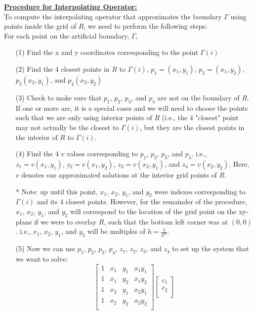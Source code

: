 \documentclass[12pt]{article}
\begin{document}
\noindent
\underline{\textbf{Procedure for Interpolating Operator:}} \text{ }\\
To compute the interpolating operator that approximates the boundary $\Gamma$ using points inside the grid of $R$, we need to perform the following steps:\\

\noindent
For each point on the artificial boundary, $\Gamma$,
\begin{itemize}
\item[(1)] Find the x and y coordinates corresponding to the point $\Gamma(i)$
\item[(2)] Find the 4 closest points in $R$ to $\Gamma(i)$, $p_1=(x_1,y_1)$, $p_2=(x_1,y_2)$, $p_3(x_2,y_1)$, and $p_4(x_2,y_2)$
\item[(3)] Check to make sure that $p_1$, $p_2$, $p_3$, and $p_4$ are not on the boundary of $R$.  If one or more are, it is a special cases and we will need to choose the points such that we are only using interior points of $R$ (i.e., the 4 "closest" point may not actually be the closest to $\Gamma(i)$, but they are the closest points in the interior of $R$ to $\Gamma(i)$.
\item[(4)] Find the 4 $v$ values corresponding to $p_1$, $p_2$, $p_3$, and $p_4$. i.e., $z_1=v(x_1,y_1)$, $z_2=v(x_1,y_2)$, $z_3=v(x_2,y_1)$, and $z_4=v(x_2,y_2)$.  Here, $v$ denotes our approximated solutions at the interior grid points of $R$.
\item[*] Note: up until this point, $x_1$, $x_2$, $y_1$, and $y_2$ were indexes corresponding to $\Gamma(i)$ and its 4 closest points.  However, for the remainder of the procedure, $x_1$, $x_2$, $y_1$, and $y_2$ will correspond to the location of the grid point on the xy-plane if we were to overlay $R$, such that the bottom left corner was at $(0,0)$. i.e., $x_1$, $x_2$, $y_1$, and $y_2$ will be multiples of $h = \frac{1}{2^m}$.
\item[(5)] Now we can use $p_1$, $p_2$, $p_3$, $p_4$, $z_1$, $z_2$, $z_3$, and $z_4$ to set up the system that we want to solve:
$$\begin{bmatrix}
1 & x_1 & y_1 & x_1y_1 \\
1 & x_1 & y_2 & x_1y_2 \\
1 & x_2 & y_1 & x_2y_1 \\
1 & x_2 & y_2 & x_2y_2 \\
\end{bmatrix} \begin{bmatrix}
				c_1 \\
				c_2 \\

\end{bmatrix}$$
\end{itemize}
\end{document}
